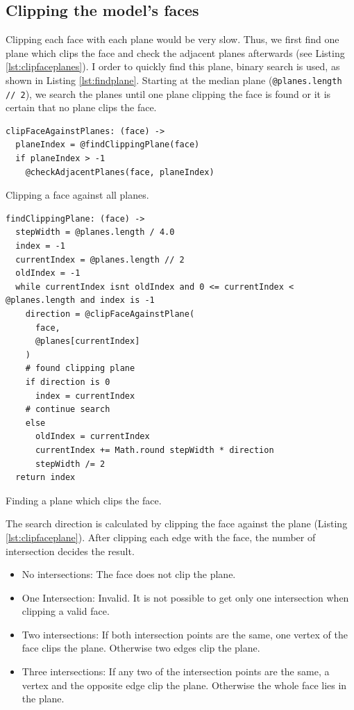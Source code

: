 \documentclass[../ClassicThesis.tex]{subfiles}
\begin{document}
\subsection{Clipping the model's faces}

Clipping each face with each plane would be very slow. Thus, we first find one plane which clips the face and check the adjacent planes afterwards (see Listing \ref{lst:clipfaceplanes}). I order to quickly find this plane, binary search is used, as shown in Listing \ref{lst:findplane}. Starting at the median plane (\texttt{@planes.length // 2}), we search the planes until one plane clipping the face is found or it is certain that no plane clips the face.

\begin{listing}[ht]
\begin{verbatim}
clipFaceAgainstPlanes: (face) ->
  planeIndex = @findClippingPlane(face)
  if planeIndex > -1
    @checkAdjacentPlanes(face, planeIndex)
\end{verbatim}
\caption{Clipping a face against all planes.}
\label{lst:clipfaceplanes}
\end{listing}

\begin{listing}[ht]
\begin{verbatim}
findClippingPlane: (face) ->
  stepWidth = @planes.length / 4.0
  index = -1
  currentIndex = @planes.length // 2
  oldIndex = -1
  while currentIndex isnt oldIndex and 0 <= currentIndex < @planes.length and index is -1
    direction = @clipFaceAgainstPlane(
      face, 
      @planes[currentIndex]
    )
    # found clipping plane
    if direction is 0
      index = currentIndex
    # continue search
    else
      oldIndex = currentIndex
      currentIndex += Math.round stepWidth * direction
      stepWidth /= 2
  return index
\end{verbatim}
\caption{Finding a plane which clips the face.}
\label{lst:findplane}
\end{listing}

The search direction is calculated by clipping the face against the plane (Listing \ref{lst:clipfaceplane}). After clipping each edge with the face, the number of intersection decides the result.

\begin{itemize}
  \item No intersections: The face does not clip the plane.
  \item One Intersection: Invalid. It is not possible to get only one intersection when clipping a valid face.
  \item Two intersections: If both intersection points are the same, one vertex of the face clips the plane. Otherwise two edges clip the plane.
  \item Three intersections: If any two of the intersection points are the same, a vertex and the opposite edge clip the plane. Otherwise the whole face lies in the plane.
\end{itemize}
\end{document}
